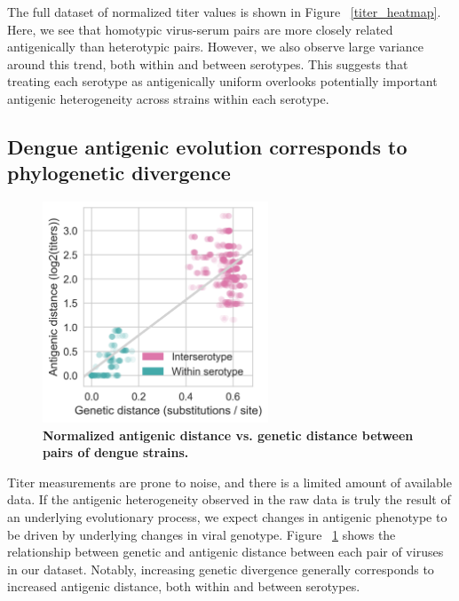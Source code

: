 \documentclass[11pt,oneside,letterpaper]{article}
\begin{document}
The full dataset of normalized titer values is shown in Figure ~\ref{titer_heatmap}.
Here, we see that homotypic virus-serum pairs are more closely related antigenically than heterotypic pairs.
However, we also observe large variance around this trend, both within and between serotypes.
This suggests that treating each serotype as antigenically uniform overlooks potentially important antigenic heterogeneity across strains within each serotype.

\subsection{Dengue antigenic evolution corresponds to phylogenetic divergence}

\begin{figure}[h]
  \begin{centering}
  \includegraphics[width=0.6\textwidth]{../figures/png/genetic_antigenic_distance.png}
  	\caption{\textbf{Normalized antigenic distance vs. genetic distance between pairs of dengue strains.}}
  	\label{genetic_antigenic_distance}
  \end{centering}
\end{figure}

Titer measurements are prone to noise, and there is a limited amount of available data.
If the antigenic heterogeneity observed in the raw data is truly the result of an underlying evolutionary process, we expect changes in antigenic phenotype to be driven by underlying changes in viral genotype.
Figure ~\ref{genetic_antigenic_distance} shows the relationship between genetic and antigenic distance between each pair of viruses in our dataset.
Notably, increasing genetic divergence generally corresponds to increased antigenic distance, both within and between serotypes.
\end{document}
